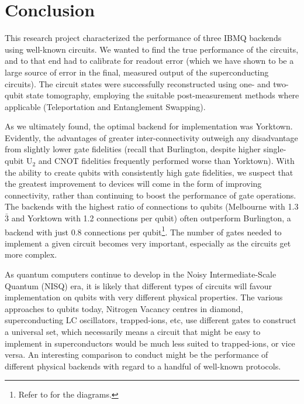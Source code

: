 \section{Conclusion}

This research project characterized the performance of three IBMQ backends using
well-known circuits. We wanted to find the true performance of the circuits, and
to that end had to calibrate for readout error (which we have shown to be a
large source of error in the final, measured output of the superconducting
circuits). The circuit states were successfully reconstructed using one- and
two-qubit state tomography, employing the suitable post-measurement methods
where applicable (Teleportation and Entanglement Swapping).

As we ultimately found, the optimal backend for implementation was Yorktown.
Evidently, the advantages of greater inter-connectivity outweigh any
disadvantage from slightly lower gate fidelities (recall that Burlington,
despite higher single-qubit U$_2$ and CNOT fidelities frequently performed worse
than Yorktown). With the ability to create qubits with consistently high gate
fidelities, we suspect that the greatest improvement to devices will come in the
form of improving connectivity, rather than continuing to boost the performance
of gate operations. The backends with the highest ratio of connections to qubits
(Melbourne with 1.3$\bar{3}$ and Yorktown with 1.2 connections per qubit) often
outperform Burlington, a backend with just 0.8 connections per
qubit\footnote{Refer to  for the diagrams.}. The number
of gates needed to implement a given circuit becomes very important, especially
as the circuits get more complex.

As quantum computers continue to develop in the Noisy Intermediate-Scale Quantum
(NISQ) era, it is likely that different types of circuits will favour
implementation on qubits with very different physical properties. The various
approaches to qubits today, Nitrogen Vacancy centres in diamond, superconducting
LC oscillators, trapped-ions, etc, use different gates to construct a universal set,
which necessarily means a circuit that might be easy to implement in
superconductors would be much less suited to trapped-ions, or vice versa. An
interesting comparison to conduct might be the performance of different
physical backends with regard to a handful of well-known protocols.

\newpage

